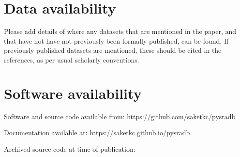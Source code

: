 \documentclass[9pt,a4paper]{extarticle}
\begin{document}
\begin{comment}

\section*{Discussion} %
This section is only required if the paper includes novel data or analyses, and should be written in the same style as a traditional discussion section.
Please include a brief discussion of allowances made (if any) for controlling bias or unwanted sources of variability, and the limitations of any novel datasets.


\section*{Conclusions} %
This section is only required if the paper includes novel data or analyses, and should be written as a traditional conclusion.

\section*{Summary} %
This section is required if the paper does not include novel data or analyses.  It allows authors to briefly summarize the key points from the article.


\end{comment}

\section*{Data availability} %
Please add details of where any datasets that are mentioned in the paper, and that have not have not previously been formally published, can be found.  If previously published datasets are mentioned, these should be cited in the references, as per usual scholarly conventions.

\section*{Software availability}
Software and source code available from: https://github.com/saketkc/pysradb

Documentation available at: https://saketkc.github.io/pysradb

Archived source code at time of publication: 
\end{document}
